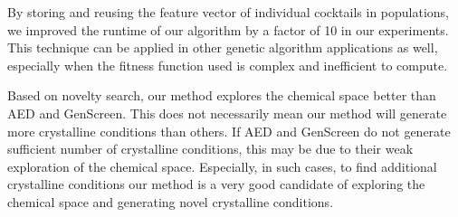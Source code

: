 By storing and reusing the feature vector of individual cocktails in populations, we improved the runtime of our algorithm by a factor of 10 in our experiments. This technique can be applied in other genetic algorithm applications as well, especially when the fitness function used is complex and inefficient to compute.

Based on novelty search, our method explores the chemical space better than AED and GenScreen. This does not necessarily mean our method will generate more crystalline conditions than others. If AED and GenScreen do not generate sufficient number of crystalline conditions, this may be due to their weak exploration of the chemical space. Especially, in such cases, to find additional crystalline conditions our method is a very good candidate of exploring the chemical space and generating novel crystalline conditions.


